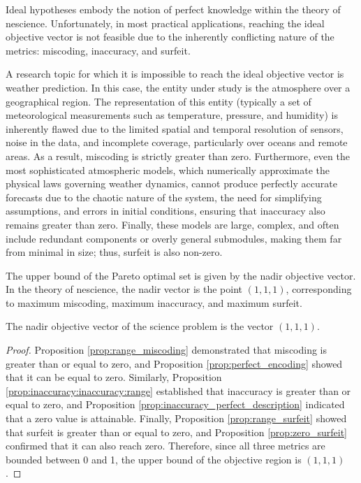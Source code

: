 Ideal hypotheses embody the notion of perfect knowledge within the theory of nescience. Unfortunately, in most practical applications, reaching the ideal objective vector is not feasible due to the inherently conflicting nature of the metrics: miscoding, inaccuracy, and surfeit.

\begin{example}
A research topic for which it is impossible to reach the ideal objective vector is weather prediction. In this case, the entity under study is the atmosphere over a geographical region. The representation of this entity (typically a set of meteorological measurements such as temperature, pressure, and humidity) is inherently flawed due to the limited spatial and temporal resolution of sensors, noise in the data, and incomplete coverage, particularly over oceans and remote areas. As a result, miscoding is strictly greater than zero. Furthermore, even the most sophisticated atmospheric models, which numerically approximate the physical laws governing weather dynamics, cannot produce perfectly accurate forecasts due to the chaotic nature of the system, the need for simplifying assumptions, and errors in initial conditions, ensuring that inaccuracy also remains greater than zero. Finally, these models are large, complex, and often include redundant components or overly general submodules, making them far from minimal in size; thus, surfeit is also non-zero.
\end{example}

The upper bound of the Pareto optimal set is given by the nadir objective vector. In the theory of nescience, the nadir vector is the point $(1, 1, 1)$, corresponding to maximum miscoding, maximum inaccuracy, and maximum surfeit.

\begin{proposition}
The nadir objective vector of the science problem is the vector $(1, 1, 1)$.
\end{proposition}
\begin{proof}
Proposition \ref{prop:range_miscoding} demonstrated that miscoding is greater than or equal to zero, and Proposition \ref{prop:perfect_encoding} showed that it can be equal to zero. Similarly, Proposition \ref{prop:inaccuracy:inaccuracy:range} established that inaccuracy is greater than or equal to zero, and Proposition \ref{prop:inaccuracy_perfect_description} indicated that a zero value is attainable. Finally, Proposition \ref{prop:range_surfeit} showed that surfeit is greater than or equal to zero, and Proposition \ref{prop:zero_surfeit} confirmed that it can also reach zero. Therefore, since all three metrics are bounded between 0 and 1, the upper bound of the objective region is $(1, 1, 1)$.
\end{proof}

